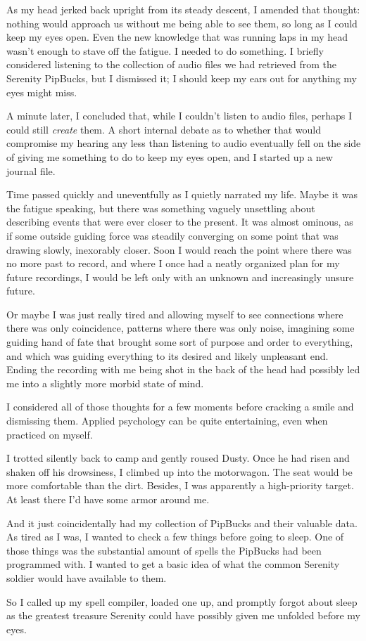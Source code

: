 As my head jerked back upright from its steady descent, I amended that thought: nothing would approach us without me being able to see them, so long as I could keep my eyes open. Even the new knowledge that was running laps in my head wasn’t enough to stave off the fatigue. I needed to do something. I briefly considered listening to the collection of audio files we had retrieved from the Serenity PipBucks, but I dismissed it; I should keep my ears out for anything my eyes might miss.

A minute later, I concluded that, while I couldn’t listen to audio files, perhaps I could still \textit{create} them. A short internal debate as to whether that would compromise my hearing any less than listening to audio eventually fell on the side of giving me something to do to keep my eyes open, and I started up a new journal file.

Time passed quickly and uneventfully as I quietly narrated my life. Maybe it was the fatigue speaking, but there was something vaguely unsettling about describing events that were ever closer to the present. It was almost ominous, as if some outside guiding force was steadily converging on some point that was drawing slowly, inexorably closer. Soon I would reach the point where there was no more past to record, and where I once had a neatly organized plan for my future recordings, I would be left only with an unknown and increasingly unsure future.

Or maybe I was just really tired and allowing myself to see connections where there was only coincidence, patterns where there was only noise, imagining some guiding hand of fate that brought some sort of purpose and order to everything, and which was guiding everything to its desired and likely unpleasant end. Ending the recording with me being shot in the back of the head had possibly led me into a slightly more morbid state of mind.

I considered all of those thoughts for a few moments before cracking a smile and dismissing them. Applied psychology can be quite entertaining, even when practiced on myself.

I trotted silently back to camp and gently roused Dusty. Once he had risen and shaken off his drowsiness, I climbed up into the motorwagon. The seat would be more comfortable than the dirt. Besides, I was apparently a high-priority target. At least there I’d have some armor around me.

And it just coincidentally had my collection of PipBucks and their valuable data. As tired as I was, I wanted to check a few things before going to sleep. One of those things was the substantial amount of spells the PipBucks had been programmed with. I wanted to get a basic idea of what the common Serenity soldier would have available to them.

So I called up my spell compiler, loaded one up, and promptly forgot about sleep as the greatest treasure Serenity could have possibly given me unfolded before my eyes.